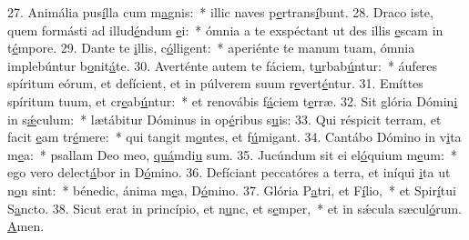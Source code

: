 27. Animália pus\uline{í}lla cum m\uline{a}gnis:~* illic naves p\uline{e}rtrans\uline{í}bunt.
28. Draco iste, quem formásti ad illud\uline{é}ndum \uline{e}i:~* ómnia a te exspéctant ut des illis \uline{e}scam in t\uline{é}mpore.
29. Dante te \uline{i}llis, c\uline{ó}lligent:~* aperiénte te manum tuam, ómnia implebúntur b\uline{o}nit\uline{á}te.
30. Averténte autem te fáciem, t\uline{u}rbab\uline{ú}ntur:~* áuferes spíritum eórum, et defícient, et in púlverem suum r\uline{e}vert\uline{é}ntur.
31. Emíttes spíritum tuum, et cr\uline{e}ab\uline{ú}ntur:~* et renovábis f\uline{á}ciem t\uline{e}rræ.
32. Sit glória Dómin\uline{i} in s\uline{ǽ}culum:~* lætábitur Dóminus in op\uline{é}ribus s\uline{u}is:
33. Qui réspicit terram, et facit \uline{e}am tr\uline{é}mere:~* qui tangit m\uline{o}ntes, et f\uline{ú}migant.
34. Cantábo Dómino in v\uline{i}ta m\uline{e}a:~* psallam Deo meo, \uline{quá}mdi\uline{u} sum.
35. Jucúndum sit ei el\uline{ó}quium m\uline{e}um:~* ego vero delect\uline{á}bor in D\uline{ó}mino.
36. Defíciant peccatóres a terra, et iníqui \uline{i}ta ut n\uline{o}n sint:~* bénedic, ánima m\uline{e}a, D\uline{ó}mino.
37. Glória P\uline{a}tri, et F\uline{í}lio,~* et Spir\uline{í}tui S\uline{a}ncto.
38. Sicut erat in princípio, et n\uline{u}nc, et s\uline{e}mper,~* et in sǽcula sæcul\uline{ó}rum. \uline{A}men.
